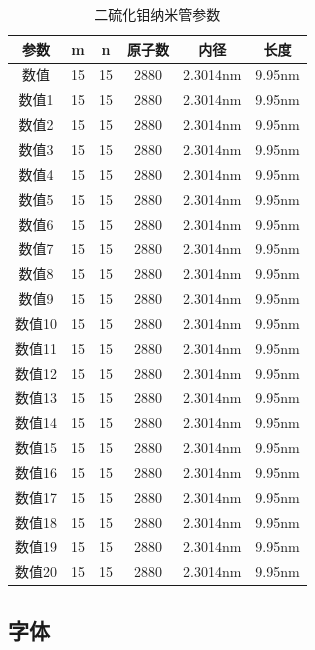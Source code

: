 \documentclass[AutoFakeBold]{LZUThesis2007}
\begin{document}
\begin{longtable}{cccccc} %
    \caption{二硫化钼纳米管参数}\label{tbl_mos2_nanotube}\\
    \toprule
    参数& m & n & 原子数 & 内径 & 长度\\
    \midrule
    数值 & 15 & 15  & 2880 & 2.3014nm & 9.95nm \\
    数值1 & 15 & 15  & 2880 & 2.3014nm & 9.95nm \\
    数值2 & 15 & 15  & 2880 & 2.3014nm & 9.95nm \\
    数值3 & 15 & 15  & 2880 & 2.3014nm & 9.95nm \\
    数值4 & 15 & 15  & 2880 & 2.3014nm & 9.95nm \\
    数值5 & 15 & 15  & 2880 & 2.3014nm & 9.95nm \\
    数值6 & 15 & 15  & 2880 & 2.3014nm & 9.95nm \\
    数值7 & 15 & 15  & 2880 & 2.3014nm & 9.95nm \\
    数值8 & 15 & 15  & 2880 & 2.3014nm & 9.95nm \\
    数值9 & 15 & 15  & 2880 & 2.3014nm & 9.95nm \\
    数值10 & 15 & 15  & 2880 & 2.3014nm & 9.95nm \\
    数值11 & 15 & 15  & 2880 & 2.3014nm & 9.95nm \\
    数值12 & 15 & 15  & 2880 & 2.3014nm & 9.95nm \\
    数值13 & 15 & 15  & 2880 & 2.3014nm & 9.95nm \\
    数值14 & 15 & 15  & 2880 & 2.3014nm & 9.95nm \\
    数值15 & 15 & 15  & 2880 & 2.3014nm & 9.95nm \\
    数值16 & 15 & 15  & 2880 & 2.3014nm & 9.95nm \\
    数值17 & 15 & 15  & 2880 & 2.3014nm & 9.95nm \\
    数值18 & 15 & 15  & 2880 & 2.3014nm & 9.95nm \\
    数值19 & 15 & 15  & 2880 & 2.3014nm & 9.95nm \\
    数值20 & 15 & 15  & 2880 & 2.3014nm & 9.95nm \\
    \bottomrule
\end{longtable}

    



\subsection{字体} %
\label{sub:字体}
\end{document}
